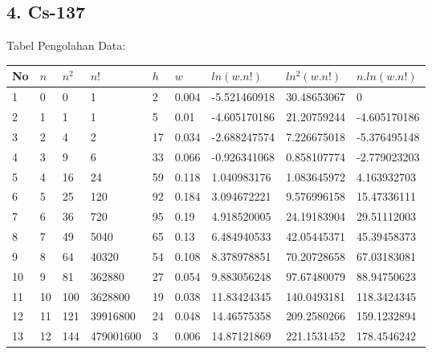 \documentclass{article}
\begin{document}
			\subsection*{4. Cs-137}
			Tabel Pengolahan Data:
			\begin{longtable}{@{}lllllllll@{}}
				\toprule
				No  & $n$  & $n^{2}$ & $n!$   & $h$   & $w$     & $ln(w.n!)$     & $ln^{2}(w.n!)$ & $n.ln(w.n!)$   \\ \midrule
				\endfirsthead
				\endhead
				\bottomrule
				\endfoot
				\endlastfoot
				1   & 0   & 0                    & 1           & 2   & 0.004 & -5.521460918 & 30.48653067                 & 0            \\
				2   & 1   & 1                    & 1           & 5   & 0.01  & -4.605170186 & 21.20759244                 & -4.605170186 \\
				3   & 2   & 4                    & 2           & 17  & 0.034 & -2.688247574 & 7.226675018                 & -5.376495148 \\
				4   & 3   & 9                    & 6           & 33  & 0.066 & -0.926341068 & 0.858107774                 & -2.779023203 \\
				5   & 4   & 16                   & 24          & 59  & 0.118 & 1.040983176  & 1.083645972                 & 4.163932703  \\
				6   & 5   & 25                   & 120         & 92  & 0.184 & 3.094672221  & 9.576996158                 & 15.47336111  \\
				7   & 6   & 36                   & 720         & 95  & 0.19  & 4.918520005  & 24.19183904                 & 29.51112003  \\
				8   & 7   & 49                   & 5040        & 65  & 0.13  & 6.484940533  & 42.05445371                 & 45.39458373  \\
				9   & 8   & 64                   & 40320       & 54  & 0.108 & 8.378978851  & 70.20728658                 & 67.03183081  \\
				10  & 9   & 81                   & 362880      & 27  & 0.054 & 9.883056248  & 97.67480079                 & 88.94750623  \\
				11  & 10  & 100                  & 3628800     & 19  & 0.038 & 11.83424345  & 140.0493181                 & 118.3424345  \\
				12  & 11  & 121                  & 39916800    & 24  & 0.048 & 14.46575358  & 209.2580266                 & 159.1232894  \\
				13  & 12  & 144                  & 479001600   & 3   & 0.006 & 14.87121869  & 221.1531452                 & 178.4546242  \\

\end{longtable}
\end{document}
